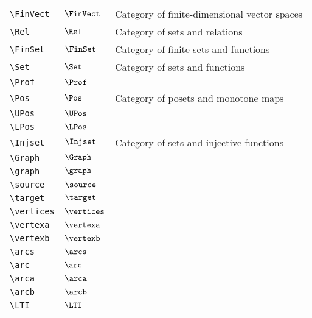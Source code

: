 \begin{longtable}{lll}
 {\color[rgb]{0.5,0.5,0.5}\texttt{\textbackslash FinVect}} & $\FinVect$ &  Category of finite-dimensional vector spaces\\ 
 {\color[rgb]{0.5,0.5,0.5}\texttt{\textbackslash Rel}} & $\Rel$ &  Category of sets and relations\\ 
 {\color[rgb]{0.5,0.5,0.5}\texttt{\textbackslash FinSet}} & $\FinSet$ &  Category of finite sets and functions\\ 
 {\color[rgb]{0.5,0.5,0.5}\texttt{\textbackslash Set}} & $\Set$ &  Category of sets and functions\\ 
 {\color[rgb]{0.5,0.5,0.5}\texttt{\textbackslash Prof}} & $\Prof$ & \\ 
 {\color[rgb]{0.5,0.5,0.5}\texttt{\textbackslash Pos}} & $\Pos$ &  Category of posets and monotone maps\\ 
 {\color[rgb]{0.5,0.5,0.5}\texttt{\textbackslash UPos}} & $\UPos$ & \\ 
 {\color[rgb]{0.5,0.5,0.5}\texttt{\textbackslash LPos}} & $\LPos$ & \\ 
 {\color[rgb]{0.5,0.5,0.5}\texttt{\textbackslash Injset}} & $\Injset$ &  Category of sets and injective functions\\ 
 {\color[rgb]{0.5,0.5,0.5}\texttt{\textbackslash Graph}} & $\Graph$ & \\ 
 {\color[rgb]{0.5,0.5,0.5}\texttt{\textbackslash graph}} & $\graph$ & \\ 
 {\color[rgb]{0.5,0.5,0.5}\texttt{\textbackslash source}} & $\source$ & \\ 
 {\color[rgb]{0.5,0.5,0.5}\texttt{\textbackslash target}} & $\target$ & \\ 
 {\color[rgb]{0.5,0.5,0.5}\texttt{\textbackslash vertices}} & $\vertices$ & \\ 
 {\color[rgb]{0.5,0.5,0.5}\texttt{\textbackslash vertexa}} & $\vertexa$ & \\ 
 {\color[rgb]{0.5,0.5,0.5}\texttt{\textbackslash vertexb}} & $\vertexb$ & \\ 
 {\color[rgb]{0.5,0.5,0.5}\texttt{\textbackslash arcs}} & $\arcs$ & \\ 
 {\color[rgb]{0.5,0.5,0.5}\texttt{\textbackslash arc}} & $\arc$ & \\ 
 {\color[rgb]{0.5,0.5,0.5}\texttt{\textbackslash arca}} & $\arca$ & \\ 
 {\color[rgb]{0.5,0.5,0.5}\texttt{\textbackslash arcb}} & $\arcb$ & \\ 
 {\color[rgb]{0.5,0.5,0.5}\texttt{\textbackslash LTI}} & $\LTI$ & \\ 

\end{longtable}
